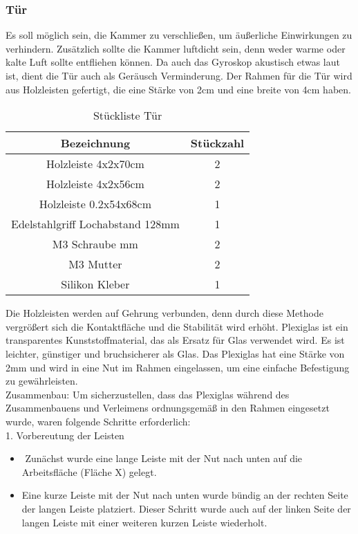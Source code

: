 \subsubsection{Tür}
Es soll möglich sein, die Kammer zu verschließen, um äußerliche Einwirkungen zu verhindern. Zusätzlich sollte die Kammer luftdicht sein, denn weder warme oder kalte Luft sollte entfliehen können. Da auch das Gyroskop akustisch etwas laut ist, dient die Tür auch als Geräusch Verminderung. 
Der Rahmen für die Tür wird aus Holzleisten gefertigt, die eine Stärke von 2cm und eine breite von 4cm haben.\\
\vspace{3mm}
\begin{table}[H]
    \centering
    \begin{tabular}{ | c | c | } 
  \hline
   \textbf{Bezeichnung} & \textbf{Stückzahl}\\ 
  \hline
   Holzleiste 4x2x70cm & 2\\ 
  \hline
   Holzleiste 4x2x56cm & 2 \\ 
  \hline
  Holzleiste 0.2x54x68cm & 1\\
  \hline
  Edelstahlgriff Lochabstand 128mm & 1\\
  \hline
  M3 Schraube mm & 2\\
  \hline
  M3 Mutter & 2\\
  \hline
  Silikon Kleber & 1\\
  \hline
\end{tabular}
    \caption{Stückliste Tür}
\end{table}
\newpage
Die Holzleisten werden auf Gehrung verbunden, denn durch diese Methode vergrößert sich die Kontaktfläche und die Stabilität wird erhöht. 
Plexiglas ist ein transparentes Kunststoffmaterial, das als Ersatz für Glas verwendet wird. Es ist leichter, günstiger und bruchsicherer als Glas. Das Plexiglas hat eine Stärke von 2mm und wird in eine Nut im Rahmen eingelassen, um eine einfache Befestigung zu gewährleisten.  \\
\vspace{3mm}
Zusammenbau:
Um sicherzustellen, dass das Plexiglas während des Zusammenbauens und Verleimens ordnungsgemäß in den Rahmen eingesetzt wurde, waren folgende Schritte erforderlich:\\
\vspace{3mm}
1. Vorbereutung der Leisten
\begin{itemize}
    \item  Zunächst wurde eine lange Leiste mit der Nut nach unten auf die Arbeitsfläche (Fläche X) gelegt.
    \item Eine kurze Leiste mit der Nut nach unten wurde bündig an der rechten Seite der langen Leiste platziert. Dieser Schritt wurde auch auf der linken Seite der langen Leiste mit einer weiteren kurzen Leiste wiederholt.
\end{itemize}
